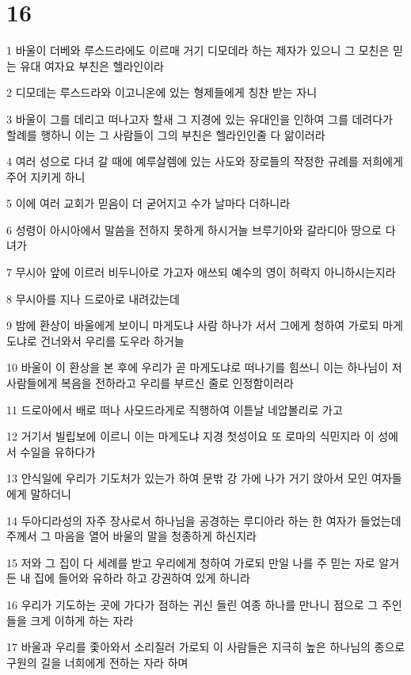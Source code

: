 \chapter{16}

\par 1 바울이 더베와 루스드라에도 이르매 거기 디모데라 하는 제자가 있으니 그 모친은 믿는 유대 여자요 부친은 헬라인이라
\par 2 디모데는 루스드라와 이고니온에 있는 형제들에게 칭찬 받는 자니
\par 3 바울이 그를 데리고 떠나고자 할새 그 지경에 있는 유대인을 인하여 그를 데려다가 할례를 행하니 이는 그 사람들이 그의 부친은 헬라인인줄 다 앎이러라
\par 4 여러 성으로 다녀 갈 때에 예루살렘에 있는 사도와 장로들의 작정한 규례를 저희에게 주어 지키게 하니
\par 5 이에 여러 교회가 믿음이 더 굳어지고 수가 날마다 더하니라
\par 6 성령이 아시아에서 말씀을 전하지 못하게 하시거늘 브루기아와 갈라디아 땅으로 다녀가
\par 7 무시아 앞에 이르러 비두니아로 가고자 애쓰되 예수의 영이 허락지 아니하시는지라
\par 8 무시아를 지나 드로아로 내려갔는데
\par 9 밤에 환상이 바울에게 보이니 마게도냐 사람 하나가 서서 그에게 청하여 가로되 마게도냐로 건너와서 우리를 도우라 하거늘
\par 10 바울이 이 환상을 본 후에 우리가 곧 마게도냐로 떠나기를 힘쓰니 이는 하나님이 저 사람들에게 복음을 전하라고 우리를 부르신 줄로 인정함이러라
\par 11 드로아에서 배로 떠나 사모드라게로 직행하여 이튿날 네압볼리로 가고
\par 12 거기서 빌립보에 이르니 이는 마게도냐 지경 첫성이요 또 로마의 식민지라 이 성에서 수일을 유하다가
\par 13 안식일에 우리가 기도처가 있는가 하여 문밖 강 가에 나가 거기 앉아서 모인 여자들에게 말하더니
\par 14 두아디라성의 자주 장사로서 하나님을 공경하는 루디아라 하는 한 여자가 들었는데 주께서 그 마음을 열어 바울의 말을 청종하게 하신지라
\par 15 저와 그 집이 다 세례를 받고 우리에게 청하여 가로되 만일 나를 주 믿는 자로 알거든 내 집에 들어와 유하라 하고 강권하여 있게 하니라
\par 16 우리가 기도하는 곳에 가다가 점하는 귀신 들린 여종 하나를 만나니 점으로 그 주인들을 크게 이하게 하는 자라
\par 17 바울과 우리를 좇아와서 소리질러 가로되 이 사람들은 지극히 높은 하나님의 종으로 구원의 길을 너희에게 전하는 자라 하며
